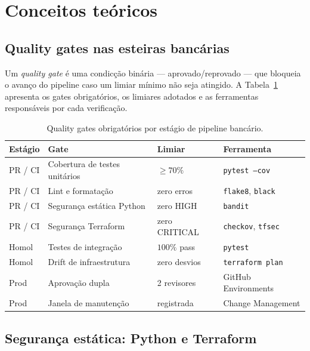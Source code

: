 \section{Conceitos te\'oricos}

\subsection{Quality gates nas esteiras banc\'arias}

Um \textit{quality gate} \'e uma condic\c{c}\~ao bin\'aria --- aprovado/reprovado
--- que bloqueia o avan\c{c}o do pipeline caso um limiar m\'inimo n\~ao
seja atingido. A Tabela~\ref{tab:quality_gates} apresenta os gates
obrigat\'orios, os limiares adotados e as ferramentas respons\'aveis
por cada verifica\c{c}\~ao.

\begin{table}[ht]
  \centering
  \caption{Quality gates obrigat\'orios por est\'agio de pipeline banc\'ario.}
  \label{tab:quality_gates}
  \begin{tabular}{llll}
    \toprule
    Est\'agio & Gate & Limiar & Ferramenta \\
    \midrule
    PR / CI   & Cobertura de testes unit\'arios & $\geq 70\%$  & \texttt{pytest --cov} \\
    PR / CI   & Lint e formata\c{c}\~ao         & zero erros   & \texttt{flake8}, \texttt{black} \\
    PR / CI   & Seguran\c{c}a est\'atica Python  & zero HIGH    & \texttt{bandit} \\
    PR / CI   & Seguran\c{c}a Terraform          & zero CRITICAL & \texttt{checkov}, \texttt{tfsec} \\
    Homol     & Testes de integra\c{c}\~ao       & $100\%$ pass & \texttt{pytest} \\
    Homol     & Drift de infraestrutura          & zero desvios & \texttt{terraform plan} \\
    Prod      & Aprova\c{c}\~ao dupla            & 2 revisores  & GitHub Environments \\
    Prod      & Janela de manuten\c{c}\~ao        & registrada   & Change Management \\
    \bottomrule
  \end{tabular}
\end{table}

\subsection{Segurança estática: Python e Terraform}

